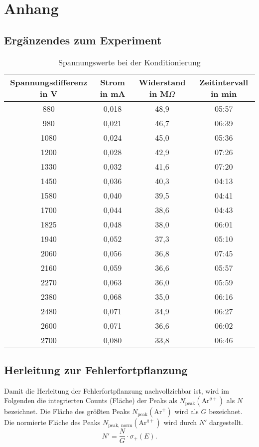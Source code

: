 \appendix
\chapter[]{Anhang}
\section{Ergänzendes zum Experiment}
\begin{table}[H]
    \caption{Spannungswerte bei der Konditionierung}
    \label{tab:Konditionierung}
    \begin{tabular}{cccc}
        Spannungsdifferenz in V & Strom in mA &	Widerstand in M$\Omega$ & Zeitintervall in min\\   
        \midrule
            880  & 0,018 & 48,9 & 05:57\\
            980  & 0,021 & 46,7 & 06:39\\
            1080 & 0,024 & 45,0 & 05:36\\
            1200 & 0,028 & 42,9 & 07:26\\
            1330 & 0,032 & 41,6 & 07:20\\
            1450 & 0,036 & 40,3 & 04:13\\
            1580 & 0,040 & 39,5 & 04:41\\
            1700 & 0,044 & 38,6 & 04:43\\
            1825 & 0,048 & 38,0 & 06:01\\
            1940 & 0,052 & 37,3 & 05:10\\
            2060 & 0,056 & 36,8 & 07:45\\
            2160 & 0,059 & 36,6 & 05:57\\
            2270 & 0,063 & 36,0 & 05:59\\
            2380 & 0,068 & 35,0 & 06:16\\
            2480 & 0,071 & 34,9 & 06:27\\
            2600 & 0,071 & 36,6 & 06:02\\
            2700 & 0,080 & 33,8 & 06:46\\      
    \end{tabular}
\end{table}

\section{Herleitung zur Fehlerfortpflanzung}
\label{sec:fehlerfortpflanzung}
Damit die Herleitung der Fehlerfortpflanzung nachvollziehbar ist, wird im Folgenden die integrierten Counts (Fläche) der Peaks als $N_\text{peak}(\text{Ar}^{q+})$ als $N$ bezeichnet. Die Fläche des größten Peaks $N_\text{peak}(\text{Ar}^{+})$ wird als $G$ bezeichnet. Die normierte Fläche des Peaks $N_\text{peak, norm}(\text{Ar}^{q+})$ wird durch $N'$ dargestellt. 
\begin{equation}
    N' = \frac{N}{G} \cdot \sigma_+(E).
\end{equation}

